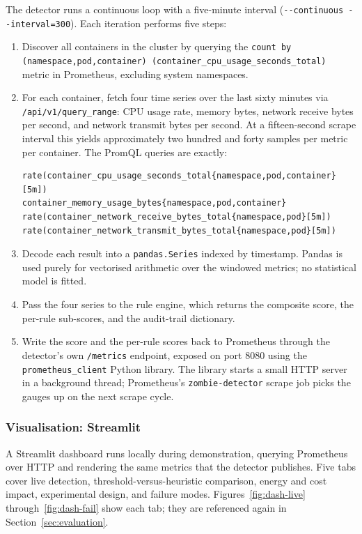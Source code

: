 \documentclass[11pt,a4paper,oneside]{article}
\begin{document}
The detector runs a continuous loop with a five-minute interval
(\texttt{-{}-continuous -{}-interval=300}). Each iteration performs five
steps:

\begin{enumerate}[leftmargin=*]
\item Discover all containers in the cluster by querying the
\texttt{count by (namespace,pod,container) (container\_cpu\_usage\_seconds\_total)}
metric in Prometheus, excluding system namespaces.
\item For each container, fetch four time series over the last sixty
minutes via \texttt{/api/v1/query\_range}: CPU usage rate, memory bytes,
network receive bytes per second, and network transmit bytes per second.
At a fifteen-second scrape interval this yields approximately two
hundred and forty samples per metric per container. The PromQL queries
are exactly:
\begin{lstlisting}
rate(container_cpu_usage_seconds_total{namespace,pod,container}[5m])
container_memory_usage_bytes{namespace,pod,container}
rate(container_network_receive_bytes_total{namespace,pod}[5m])
rate(container_network_transmit_bytes_total{namespace,pod}[5m])
\end{lstlisting}
\item Decode each result into a \texttt{pandas.Series} indexed by
timestamp. Pandas is used purely for vectorised arithmetic over the
windowed metrics; no statistical model is fitted.
\item Pass the four series to the rule engine, which returns the
composite score, the per-rule sub-scores, and the audit-trail dictionary.
\item Write the score and the per-rule scores back to Prometheus through
the detector's own \texttt{/metrics} endpoint, exposed on port 8080
using the \texttt{prometheus\_client} Python library. The library starts
a small HTTP server in a background thread; Prometheus's
\texttt{zombie-detector} scrape job picks the gauges up on the next
scrape cycle.
\end{enumerate}

\subsubsection*{Visualisation: Streamlit}
A Streamlit dashboard runs locally during demonstration, querying
Prometheus over HTTP and rendering the same metrics that the detector
publishes. Five tabs cover live detection, threshold-versus-heuristic
comparison, energy and cost impact, experimental design, and failure
modes. Figures~\ref{fig:dash-live} through~\ref{fig:dash-fail} show each
tab; they are referenced again in Section~\ref{sec:evaluation}.
\end{document}

